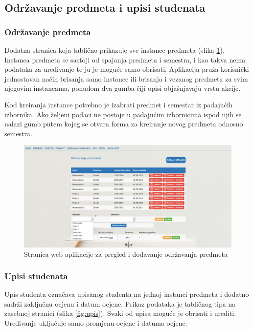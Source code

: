 \documentclass[times, utf8, diplomski]{fer}
\begin{document}
\subsection{Održavanje predmeta i upisi studenata}

\subsubsection{Održavanje predmeta}
Dodatna stranica koja tablično prikazuje sve instance predmeta (slika \ref{fig:instance}). Instanca predmeta se sastoji od spajanja predmeta i semestra, i kao takva nema podataka za uređivanje te ju je moguće samo obrisati. Aplikacija pruža korisnički jednostavan način brisanja samo instance ili brisanja i vezanog predmeta za svim njegovim instancama, ponudom dva gumba čiji opisi objašnjavaju vrstu akcije.

Kod kreiranja instance potrebno je izabrati predmet i semestar iz padajućih izbornika. Ako željeni podaci ne postoje u padajućim izbornicima ispod njih se nalazi gumb putem kojeg se otvara forma za kreiranje novog predmeta odnosno semestra.

\begin{figure}[htb]
\centering
\includegraphics[width=14cm]{odrzavanja_predmeta_add.jpg}
\caption{Stranica web aplikacije za pregled i dodavanje održavanja predmeta }
\label{fig:instance}
\end{figure}

\subsubsection{Upisi studenata}
Upis studenta  označava upisanog studenta na jednoj instanci predmeta i dodatno sadrži zaključnu ocjenu i datum ocjene. Prikaz podataka je tabličnog tipa na zasebnoj stranici (slika \ref{fig:upis}). Svaki od upisa moguće je obrisati i urediti. Uređivanje uključuje samo promjenu ocjene i datuma ocjene.
\end{document}
